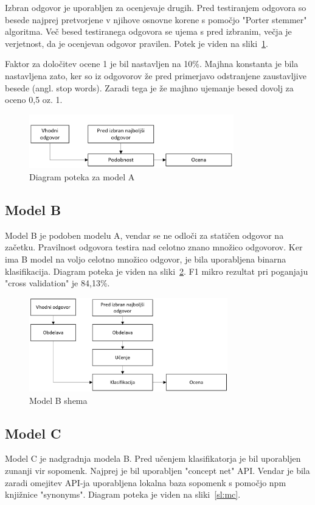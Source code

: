 \documentclass[journal]{IEEEtran}
\begin{document}
Izbran odgovor je uporabljen za ocenjevaje drugih. Pred testiranjem odgovora so besede najprej pretvorjene v njihove osnovne korene s pomočjo "Porter stemmer" algoritma. Več besed testiranega odgovora se ujema s pred izbranim, večja je verjetnost, da je ocenjevan odgovor pravilen. Potek je viden na sliki~\ref{sl:ma}. 

Faktor za določitev ocene 1 je bil nastavljen na 10\%. Majhna konstanta je bila nastavljena zato, ker so iz odgovorov že pred primerjavo odstranjene zaustavljive besede (angl. stop words). Zaradi tega je že majhno ujemanje besed dovolj za oceno 0,5 oz. 1.

\begin{figure}[h]
	\centering
	\includegraphics[width=3.5in]{A}
	\caption{Diagram poteka za model A}
	\label{sl:ma}
\end{figure}

\subsection{Model B}
Model B je podoben modelu A, vendar se ne odloči za statičen odgovor na začetku. Pravilnost odgovora testira nad celotno znano množico odgovorov. Ker ima B model na voljo celotno množico odgovor, je bila uporabljena binarna klasifikacija. Diagram poteka je viden na sliki~\ref{sl:mb}. F1 mikro rezultat pri poganjaju "cross validation" je 84,13\%.

\begin{figure}[h]
	\centering
	\includegraphics[width=3.4in]{B}
	\caption{Model B shema}
	\label{sl:mb}
\end{figure}

\subsection{Model C}
Model C je nadgradnja modela B. Pred učenjem klasifikatorja je bil uporabljen zunanji vir sopomenk. Najprej je bil uporabljen "concept net" API. Vendar je bila zaradi omejitev API-ja uporabljena lokalna baza sopomenk s pomočjo npm knjižnice "synonyms". Diagram poteka je viden na sliki~\ref{sl:mc}.
\end{document}
